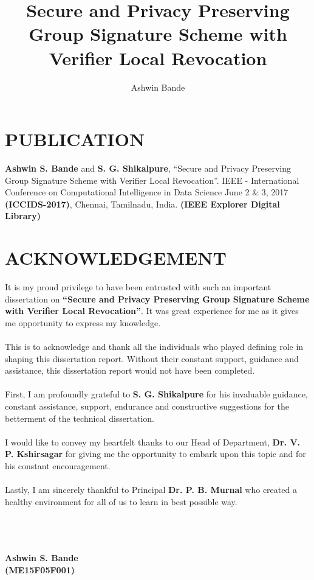 \documentclass[12pt,a4paper,oneside]{article}
\author{Ashwin Bande}
\title{Secure and Privacy Preserving Group Signature Scheme with Verifier Local
Revocation}
\begin{document}
\section*{PUBLICATION}
\textbf{Ashwin S. Bande} and \textbf{S. G. Shikalpure}, \textquotedblleft Secure and Privacy Preserving Group Signature Scheme with Verifier Local Revocation\textquotedblright. IEEE - International Conference on Computational Intelligence in Data Science June 2 \& 3, 2017 \textbf{(ICCIDS-2017)}, Chennai, Tamilnadu, India. \textbf{(IEEE Explorer Digital Library)}

\clearpage
\section*{ACKNOWLEDGEMENT}
It is my proud privilege to have been entrusted with such an important dissertation on \textbf{\textquotedblleft Secure and Privacy Preserving Group Signature Scheme with Verifier Local Revocation\textquotedblright}. It was great experience for me as it gives me opportunity to express my knowledge.\\\\
This is to acknowledge and thank all the individuals who played defining role in shaping this dissertation report. Without their constant support, guidance and assistance, this dissertation report would not have been completed.\\\\
First, I am profoundly grateful to \textbf{S. G. Shikalpure} for his invaluable guidance, constant assistance, support, endurance and constructive suggestions for the betterment of the technical dissertation.\\\\
I would like to convey my heartfelt thanks to our Head of Department, \textbf{Dr. V. P. Kshirsagar} for giving me the opportunity to embark upon this topic and for his constant encouragement.\\\\
Lastly, I am sincerely thankful to Principal \textbf{Dr. P. B. Murnal} who created a healthy environment for all of us to learn in best possible way.\\\\\\\\
\begin{flushright}
\textbf{Ashwin S. Bande~~~~\\(ME15F05F001)~~~~}
\end{flushright}
\end{document}
